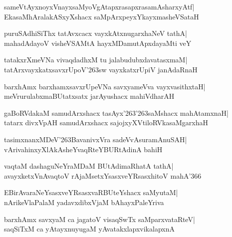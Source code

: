 \documentclass[twoside,12pt,openright]{book}
\def\S{\char'263}
\newcounter{shloka}[chapter]
\begin{document}
\begin{shloka}%
sameVtAyxnoyxVnayxsaMyoVgAtapxrasapxrasamAsharxyAtf|\\
EkasaMhAralakASxyXshacx saMpArxpeyxYkayxmasheVSataH
\end{shloka}

\begin{shloka}%
puruSAdhiSiThx tatAvxcacx vayxkAtxnugarxhaNeV tathA|\\
mahadAdayoV visheVSAMtA hayxMDamutApxdayaMti veY
\end{shloka}

\begin{shloka}%
tatakxrXmeVNa vivaqdadhxM tu jalabudubxdavatasxmaM|\\
tatArxvayxkatxsavxrUpoV\S sw vayxkatxrUpiV janAdaRnaH
\end{shloka}

\begin{shloka}%
barxhAmx barxhamxsavxrUpeVNa savxyameVva vayxvasithxtaH|\\
meVrurulabxmaBUtatxsatx jarAyushacx mahiVdharAH
\end{shloka}

\begin{shloka}%
gaBoRVdakaM samudArxshacx tasAyx\S\S saMshacx mahAtamxnaH|\\
tatarx divxVpAH samudArxshacx sajojxyXVtiloRVkasaMgarxhaH
\end{shloka}

\begin{shloka}%
tasimxnanxMDeV\S BavanivxVra sadeVvAsuramAnuSAH|\\
vArivahinxyXlAkAsheYvaqRteYBURtAdinA bahiH
\end{shloka}

\begin{shloka}%
vaqtaM dashaguNeYraMDaM BUtAdimaRhatA tathA|\\
avayxketxVnAvaqtoV rAjaMsetxYsasxveYRsasxhitoV mahA\char'366
\end{shloka}

\begin{shloka}%
EBirAvaraNeYsasxveYRsasxvaRBUteYshacx saMyutaM|\\
nArikeVlaPalaM yadavxdibxVjaM bAhayxPaleYriva
\end{shloka}

\begin{shloka}%
barxhAmx savxyaM ca jagatoV visaqSwTx saMparxvataRteV|\\
saqSiTxM ca yAtayxnuyugaM yAvatakxlapxvikalapxnA
\end{shloka}
\end{document}
